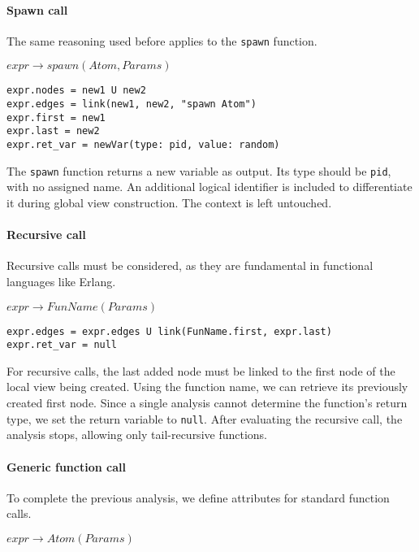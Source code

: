 \paragraph{Spawn call}  
The same reasoning used before applies to the \texttt{spawn} function.  

\bigskip

\noindent $expr \to spawn(Atom, Params)$

\begin{verbatim}
expr.nodes = new1 U new2
expr.edges = link(new1, new2, "spawn Atom")
expr.first = new1
expr.last = new2
expr.ret_var = newVar(type: pid, value: random) 
\end{verbatim}

The \texttt{spawn} function returns a new variable as output.  
Its type should be \texttt{pid}, with no assigned name.  
An additional logical identifier is included to differentiate  
it during global view construction. The context is left untouched.

\paragraph{Recursive call}  
Recursive calls must be considered, as they are fundamental  
in functional languages like Erlang.  

\bigskip

\noindent $expr \to FunName(Params)$

\begin{verbatim}
expr.edges = expr.edges U link(FunName.first, expr.last)
expr.ret_var = null
\end{verbatim}

For recursive calls, the last added node must be linked to the first  
node of the local view being created. Using the function name,  
we can retrieve its previously created first node.  
Since a single analysis cannot determine the function's return type,  
we set the return variable to \texttt{null}. After evaluating the  
recursive call, the analysis stops, allowing only tail-recursive  
functions.  

\paragraph{Generic function call}  
To complete the previous analysis, we define attributes for  
standard function calls.  

\bigskip

\noindent $expr \to Atom(Params)$

